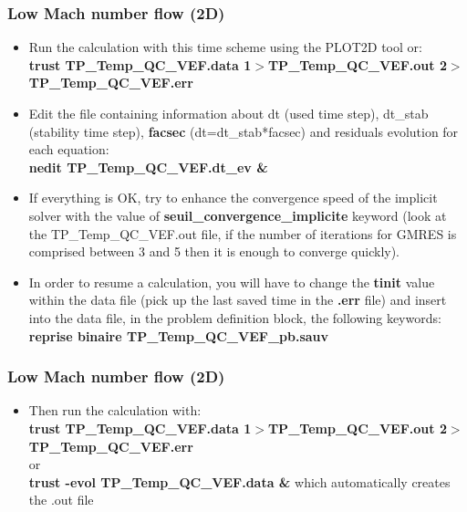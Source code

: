 \documentclass[10pt, hyperref={unicode=true,pdfusetitle, bookmarks=true,bookmarksnumbered=false,bookmarksopen=false, breaklinks=false,pdfborder={0 0 1},backref=true,colorlinks=true,linkcolor=darkblue,pageanchor}]{beamer}
\begin{document}
\begin{frame}
\frametitle{Low Mach number flow (2D)}
\begin{block}{}

\begin{itemize}
\item Run the calculation with this time scheme using the PLOT2D tool or: \\
{\footnotesize{\textbf{trust TP\_Temp\_QC\_VEF.data 1$>$TP\_Temp\_QC\_VEF.out 2$>$TP\_Temp\_QC\_VEF.err}}}

\item Edit the file containing information about dt (used time step), dt\_stab (stability time step), \textbf{facsec} (dt=dt\_stab*facsec) and residuals evolution for each equation: \\
\textbf{nedit TP\_Temp\_QC\_VEF.dt\_ev \&}

\item  If everything is OK, try to enhance the convergence speed of the implicit solver with the value of \textbf{seuil\_convergence\_implicite} keyword (look at the TP\_Temp\_QC\_VEF.out file, if the number of iterations for GMRES is comprised between 3 and 5 then it is enough to converge quickly).

\item  In order to resume a calculation, you will have to change the \textbf{tinit} value within the data file (pick up the last saved time in the \textbf{.err} file) and insert into the data file, in the problem definition block, the following keywords: \\
\textbf{reprise binaire TP\_Temp\_QC\_VEF\_pb.sauv}
\end{itemize}

\end{block}
\end{frame}
\begin{frame}
\frametitle{Low Mach number flow (2D)}
\begin{block}{}

\begin{itemize}

\item  Then run the calculation with: \\
{\footnotesize{\textbf{trust TP\_Temp\_QC\_VEF.data 1$>$TP\_Temp\_QC\_VEF.out 2$>$TP\_Temp\_QC\_VEF.err}}} \\
or \\
\textbf{trust -evol TP\_Temp\_QC\_VEF.data \&} which automatically creates the .out file

\end{itemize}

\end{block}
\end{frame}
\end{document}
